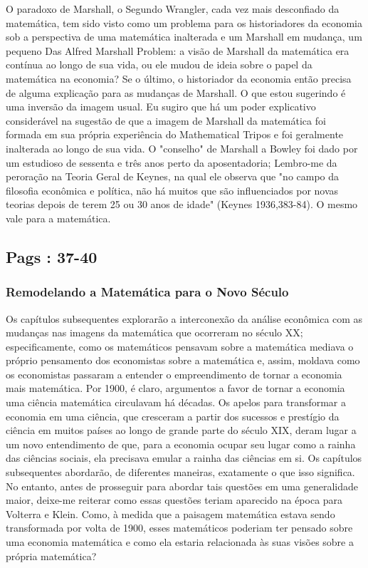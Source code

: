 \documentclass[a4paper,12pt]{article}[abntex2]
\begin{document}
O paradoxo de Marshall, o Segundo Wrangler, cada vez mais desconfiado da matemática, tem sido visto como um problema para os historiadores da economia sob a perspectiva de uma matemática inalterada e um Marshall em mudança, um pequeno Das Alfred Marshall Problem: a visão de Marshall da matemática era contínua ao longo de sua vida, ou ele mudou de ideia sobre o papel da matemática na economia? Se o último, o historiador da economia então precisa de alguma explicação para as mudanças de Marshall. O que estou sugerindo é uma inversão da imagem usual. Eu sugiro que há um poder explicativo considerável na sugestão de que a imagem de Marshall da matemática foi formada em sua própria experiência do Mathematical Tripos e foi geralmente inalterada ao longo de sua vida. O "conselho" de Marshall a Bowley foi dado por um estudioso de sessenta e três anos perto da aposentadoria; Lembro-me da peroração na Teoria Geral de Keynes, na qual ele observa que "no campo da filosofia econômica e política, não há muitos que são influenciados por novas teorias depois de terem 25 ou 30 anos de idade" (Keynes 1936,383-84). O mesmo vale para a matemática.

\subsection{\textbf{Pags : 37-40}}
\subsubsection{\textbf{Remodelando a Matemática para o Novo Século}}
Os capítulos subsequentes explorarão a interconexão da análise econômica com as mudanças nas imagens da matemática que ocorreram no século XX; especificamente, como os matemáticos pensavam sobre a matemática mediava o próprio pensamento dos economistas sobre a matemática e, assim, moldava como os economistas passaram a entender o empreendimento de tornar a economia mais matemática. Por 1900, é claro, argumentos a favor de tornar a economia uma ciência matemática circulavam há décadas. Os apelos para transformar a economia em uma ciência, que cresceram a partir dos sucessos e prestígio da ciência em muitos países ao longo de grande parte do século XIX, deram lugar a um novo entendimento de que, para a economia ocupar seu lugar como a rainha das ciências sociais, ela precisava emular a rainha das ciências em si. Os capítulos subsequentes abordarão, de diferentes maneiras, exatamente o que isso significa. No entanto, antes de prosseguir para abordar tais questões em uma generalidade maior, deixe-me reiterar como essas questões teriam aparecido na época para Volterra e Klein. Como, à medida que a paisagem matemática estava sendo transformada por volta de 1900, esses matemáticos poderiam ter pensado sobre uma economia matemática e como ela estaria relacionada às suas visões sobre a própria matemática?
\end{document}
